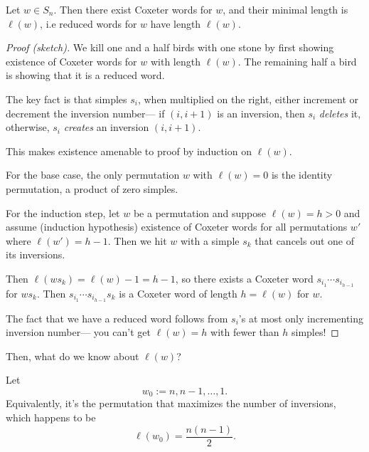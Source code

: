 \documentclass{article}
\begin{document}
\begin{theorem}
    Let $w \in S_n$.
    Then there exist Coxeter words for $w$, and their minimal length is $\ell(w)$, i.e reduced words for $w$ have length $\ell(w)$.
\end{theorem}

\begin{proof}[Proof (sketch)]
    We kill one and a half birds with one stone by first showing existence of Coxeter words for $w$ with length $\ell(w)$. 
    The remaining half a bird is showing that it is a reduced word.

    The key fact is that simples $s_i$, when multiplied on the right, either increment or decrement the inversion number--- if $(i, i+1)$ is an inversion, then $s_i$ \textit{deletes} it, otherwise, $s_i$ \textit{creates} an inversion $(i, i+1)$.

    This makes existence amenable to proof by induction on $\ell(w)$. 

    For the base case, the only permutation $w$ with $\ell(w) = 0$ is the identity permutation, a product of zero simples.

    For the induction step, let $w$ be a permutation and suppose $\ell(w) = h > 0$ and assume (induction hypothesis) existence of Coxeter words for all permutations $w'$ where $\ell(w') = h-1$.
    Then we hit $w$ with a simple $s_k$ that cancels out one of its inversions.
    
    Then $\ell(ws_k) = \ell(w)-1 = h-1$, so there exists a Coxeter word $s_{i_1}\cdots s_{i_{h-1}}$ for $ws_k$.
    Then $s_{i_1}\cdots s_{i_{h-1}}s_k$ is a Coxeter word of length $h = \ell(w)$ for $w$.

    The fact that we have a reduced word follows from $s_i$'s at most only incrementing inversion number--- you can't get $\ell(w) = h$ with fewer than $h$ simples!
\end{proof}

Then, what do we know about $\ell(w)$?

\begin{definition}
    Let
    \[
        w_0 := n,n-1,\ldots,1.
    \]
    Equivalently, it's the permutation that maximizes the number of inversions, which happens to be 
    \[
        \ell(w_0) = \frac{n(n-1)}{2}.
    \]
\end{definition}
\end{document}
